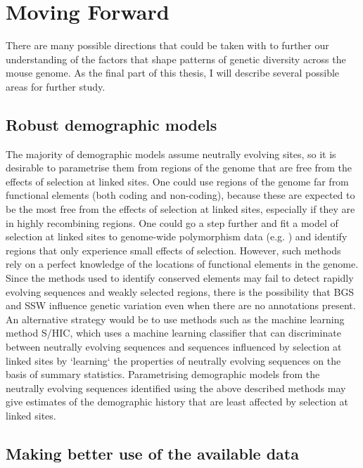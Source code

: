 \section{Moving Forward}	

	There are many possible directions that could be taken with to further our understanding of the factors that shape patterns of genetic diversity across the mouse genome. As the final part of this thesis, I will describe several possible areas for further study.
	
\subsection{Robust demographic models}

	The majority of demographic models assume neutrally evolving sites, so it is desirable to parametrise them from regions of the genome that are free from the effects of selection at linked sites. One could use regions of the genome far from functional elements (both coding and non-coding), because these are expected to be the most free from the effects of selection at linked sites, especially if they are in highly recombining regions. One could go a step further and fit a model of selection at linked sites to genome-wide polymorphism data (e.g. \citealt{RN274}) and identify regions that only experience small effects of selection. However, such methods rely on a perfect knowledge of the locations of functional elements in the genome. Since the methods used to identify conserved elements may fail to detect rapidly evolving sequences and weakly selected regions, there is the possibility that BGS and SSW influence genetic variation even when there are no annotations present. An alternative strategy would be to use methods such as the machine learning method S/HIC, which uses a machine learning classifier that can discriminate between neutrally evolving sequences and sequences influenced by selection at linked sites by `learning` the properties of neutrally evolving sequences on the basis of summary statistics. Parametrising demographic models from the neutrally evolving sequences identified using the above described methods may give estimates of the demographic history that are least affected by selection at linked sites. 

\subsection{Making better use of the available data}

